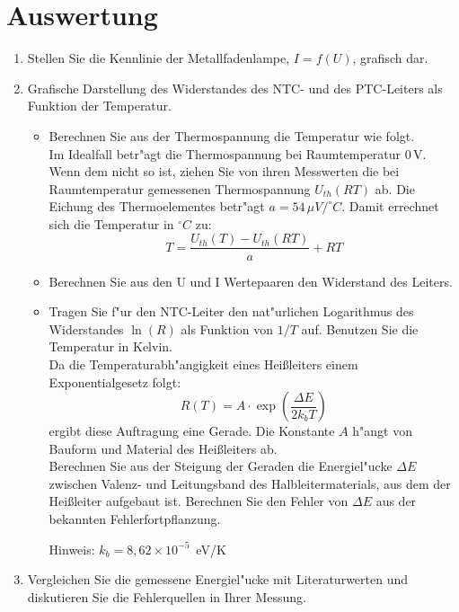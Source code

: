 \section{Auswertung} 

\begin{enumerate}
 \item Stellen Sie die Kennlinie der Metallfadenlampe, $I=f(U)$, grafisch dar.
 \item Grafische Darstellung des Widerstandes des NTC- und des PTC-Leiters als Funktion der Temperatur.
  \begin{itemize}
   \item Berechnen Sie aus der Thermospannung die Temperatur wie folgt.\\
    Im Idealfall betr"agt die Thermospannung bei Raumtemperatur 0\,V. Wenn dem nicht so ist, ziehen Sie von ihren Messwerten die bei Raumtemperatur gemessenen Thermospannung $U_{th}(RT)$ ab. Die Eichung des Thermoelementes betr"agt $a = 54\,\mu V / ^{\circ}C$. Damit errechnet sich die Temperatur in $^{\circ}C$ zu:
    \begin{equation}
     T = \frac{U_{th}(T) - U_{th}(RT)}{a} + RT
    \end{equation}
   \item Berechnen Sie aus den U und I Wertepaaren den Widerstand des Leiters.
   \item Tragen Sie f"ur den NTC-Leiter den nat"urlichen Logarithmus des Widerstandes $\ln(R)$ als Funktion von $1/T$ auf. Benutzen Sie die Temperatur in Kelvin.\\
    Da die Temperaturabh"angigkeit eines Hei{\ss}leiters einem Exponentialgesetz folgt:
    \begin{equation}
     R(T) = A\cdot \exp\left(\frac{\Delta E}{2k_b T}\right)
    \end{equation}
    ergibt diese Auftragung eine Gerade. Die Konstante $A$ h"angt von Bauform und Material des Hei{\ss}leiters ab.\\
    Berechnen Sie aus der Steigung der Geraden die Energiel"ucke $\Delta E$ zwischen Valenz- und Leitungsband des Halbleitermaterials, aus dem der Hei{\ss}leiter aufgebaut ist. Berechnen Sie den Fehler von $\Delta E$ aus der bekannten Fehlerfortpflanzung.
    
    \noindent
    Hinweis: $k_b = 8,62 \times 10^{-5}$\, eV/K
  \end{itemize}
 \item Vergleichen Sie die gemessene Energiel"ucke mit Literaturwerten und diskutieren Sie die Fehlerquellen in Ihrer Messung.
\end{enumerate}